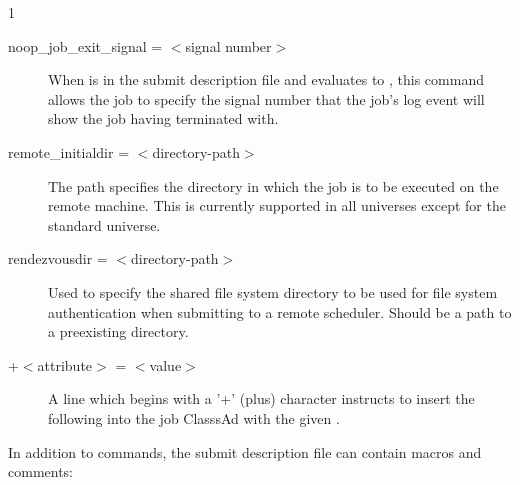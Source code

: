 \begin{ManPage}{\label{man-condor-submit}}{1}
\begin{description}
\item[noop\_job\_exit\_signal = $<$signal number$>$]
When  is in the submit description file
and evaluates to ,
this command allows the job
to specify the signal number that the job's log event will show
the job having terminated with.


\item[remote\_initialdir = $<$directory-path$>$]
The path specifies the directory in which the job is to be
executed on the remote machine.  This is currently supported in all
universes except for the standard universe.



\item[rendezvousdir = $<$directory-path$>$] Used to specify the
shared file system directory to be used for file system authentication
when submitting to a remote scheduler.  Should be a path to a preexisting
directory.


\item[+$<$attribute$>$ = $<$value$>$] A line which begins with a '+'
(plus) character instructs  to insert the
following  into the job ClasssAd with the given 
. 

\end{description} 


In addition to commands, the submit description file can contain macros
and comments:

\begin{description}


\end{description}
\end{ManPage}

